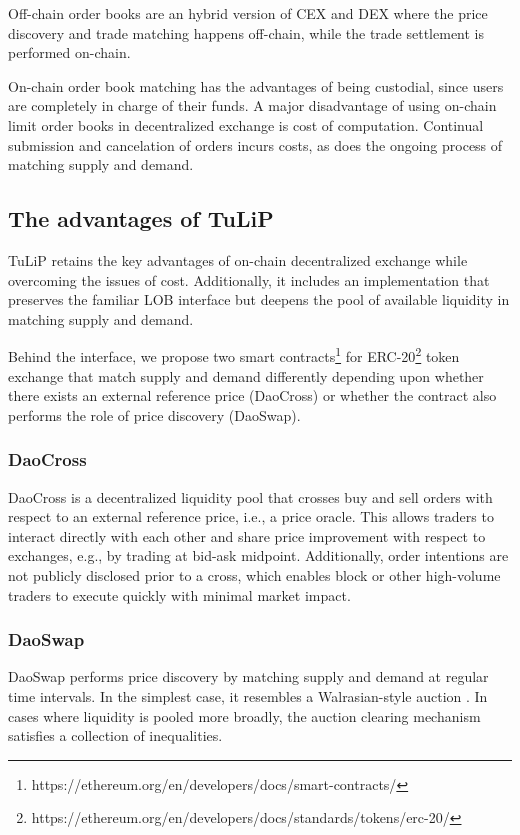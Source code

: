 \documentclass[11pt, reqno]{amsart}
\theoremstyle{definition}
\theoremstyle{remark}
\begin{document}
Off-chain order books are an hybrid version of CEX and DEX where the price
discovery and trade matching happens off-chain, while the trade settlement is
performed on-chain.

On-chain order book matching has the advantages of being custodial, since users
are completely in charge of their funds.
A major disadvantage of using on-chain limit order books in decentralized
exchange is cost of computation. Continual submission and cancelation of orders
incurs costs, as does the ongoing process of matching supply and demand.

\subsection{The advantages of TuLiP}

TuLiP retains the key advantages of on-chain decentralized exchange while
overcoming the issues of cost. Additionally, it includes an implementation
that preserves the familiar LOB interface but deepens the pool of available
liquidity in matching supply and demand.

Behind the interface, we propose two smart
contracts\footnote{https://ethereum.org/en/developers/docs/smart-contracts/}
for
ERC-20\footnote{https://ethereum.org/en/developers/docs/standards/tokens/erc-20/}
token exchange that match supply and demand differently depending upon whether
there exists an external reference price (DaoCross) or whether the contract
also performs the role of price discovery (DaoSwap).

\subsubsection{DaoCross}
DaoCross is a decentralized liquidity pool that crosses buy and sell orders
with respect to an external reference price, i.e., a price oracle. This allows
traders to interact directly with each other and share price improvement with
respect to exchanges, e.g., by trading at bid-ask midpoint. Additionally, order
intentions are not publicly disclosed prior to a cross, which enables block or
other high-volume traders to execute quickly with minimal market impact.

\subsubsection{DaoSwap}
DaoSwap performs price discovery by matching supply and demand at regular time
intervals. In the simplest case, it resembles a Walrasian-style auction
\cite{Wa}. In cases where liquidity is pooled more broadly, the auction clearing
mechanism satisfies a collection of inequalities.
\end{document}

